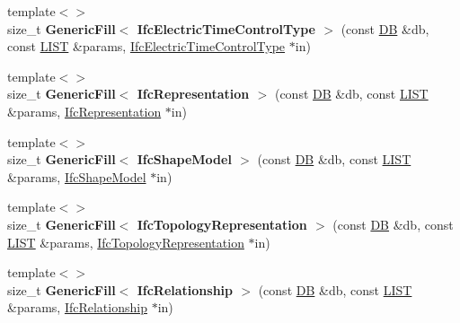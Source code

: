\begin{DoxyCompactItemize}
\item 
\hypertarget{namespace_assimp_1_1_s_t_e_p_a4d5bc5bdddb5c73ab88ba7269ef842d5}{{\footnotesize template$<$$>$ }\\size\+\_\+t {\bfseries Generic\+Fill$<$ Ifc\+Electric\+Time\+Control\+Type $>$} (const \hyperlink{class_assimp_1_1_s_t_e_p_1_1_d_b}{D\+B} \&db, const \hyperlink{class_assimp_1_1_s_t_e_p_1_1_e_x_p_r_e_s_s_1_1_l_i_s_t}{L\+I\+S\+T} \&params, \hyperlink{struct_assimp_1_1_i_f_c_1_1_ifc_electric_time_control_type}{Ifc\+Electric\+Time\+Control\+Type} $\ast$in)}\label{namespace_assimp_1_1_s_t_e_p_a4d5bc5bdddb5c73ab88ba7269ef842d5}

\item 
\hypertarget{namespace_assimp_1_1_s_t_e_p_ac8f6e5928c1d74673d1542dee2c92ac7}{{\footnotesize template$<$$>$ }\\size\+\_\+t {\bfseries Generic\+Fill$<$ Ifc\+Representation $>$} (const \hyperlink{class_assimp_1_1_s_t_e_p_1_1_d_b}{D\+B} \&db, const \hyperlink{class_assimp_1_1_s_t_e_p_1_1_e_x_p_r_e_s_s_1_1_l_i_s_t}{L\+I\+S\+T} \&params, \hyperlink{struct_assimp_1_1_i_f_c_1_1_ifc_representation}{Ifc\+Representation} $\ast$in)}\label{namespace_assimp_1_1_s_t_e_p_ac8f6e5928c1d74673d1542dee2c92ac7}

\item 
\hypertarget{namespace_assimp_1_1_s_t_e_p_add9d80d6a2bb8073aa9552d231252ff9}{{\footnotesize template$<$$>$ }\\size\+\_\+t {\bfseries Generic\+Fill$<$ Ifc\+Shape\+Model $>$} (const \hyperlink{class_assimp_1_1_s_t_e_p_1_1_d_b}{D\+B} \&db, const \hyperlink{class_assimp_1_1_s_t_e_p_1_1_e_x_p_r_e_s_s_1_1_l_i_s_t}{L\+I\+S\+T} \&params, \hyperlink{struct_assimp_1_1_i_f_c_1_1_ifc_shape_model}{Ifc\+Shape\+Model} $\ast$in)}\label{namespace_assimp_1_1_s_t_e_p_add9d80d6a2bb8073aa9552d231252ff9}

\item 
\hypertarget{namespace_assimp_1_1_s_t_e_p_ad87fbff8d1165926843b094c4f232d5b}{{\footnotesize template$<$$>$ }\\size\+\_\+t {\bfseries Generic\+Fill$<$ Ifc\+Topology\+Representation $>$} (const \hyperlink{class_assimp_1_1_s_t_e_p_1_1_d_b}{D\+B} \&db, const \hyperlink{class_assimp_1_1_s_t_e_p_1_1_e_x_p_r_e_s_s_1_1_l_i_s_t}{L\+I\+S\+T} \&params, \hyperlink{struct_assimp_1_1_i_f_c_1_1_ifc_topology_representation}{Ifc\+Topology\+Representation} $\ast$in)}\label{namespace_assimp_1_1_s_t_e_p_ad87fbff8d1165926843b094c4f232d5b}

\item 
\hypertarget{namespace_assimp_1_1_s_t_e_p_ac3efbd313cfe4b937871afacfeb8f5ae}{{\footnotesize template$<$$>$ }\\size\+\_\+t {\bfseries Generic\+Fill$<$ Ifc\+Relationship $>$} (const \hyperlink{class_assimp_1_1_s_t_e_p_1_1_d_b}{D\+B} \&db, const \hyperlink{class_assimp_1_1_s_t_e_p_1_1_e_x_p_r_e_s_s_1_1_l_i_s_t}{L\+I\+S\+T} \&params, \hyperlink{struct_assimp_1_1_i_f_c_1_1_ifc_relationship}{Ifc\+Relationship} $\ast$in)}\label{namespace_assimp_1_1_s_t_e_p_ac3efbd313cfe4b937871afacfeb8f5ae}


\end{DoxyCompactItemize}
